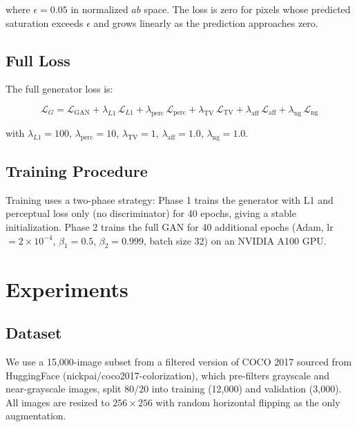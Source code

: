 \documentclass[conference]{IEEEtran}
\begin{document}
where $\epsilon = 0.05$ in normalized $ab$ space. The loss is zero for pixels
whose predicted saturation exceeds $\epsilon$ and grows linearly as the prediction
approaches zero.

\subsection{Full Loss}

The full generator loss is:

\begin{equation}
    \mathcal{L}_G = \mathcal{L}_{\text{GAN}}
    + \lambda_{L1}\,\mathcal{L}_{L1}
    + \lambda_{\text{perc}}\,\mathcal{L}_{\text{perc}}
    + \lambda_{\text{TV}}\,\mathcal{L}_{\text{TV}}
    + \lambda_{\text{aff}}\,\mathcal{L}_{\text{aff}}
    + \lambda_{\text{ng}}\,\mathcal{L}_{\text{ng}}
\end{equation}

with $\lambda_{L1} = 100$, $\lambda_{\text{perc}} = 10$,
$\lambda_{\text{TV}} = 1$, $\lambda_{\text{aff}} = 1.0$,
$\lambda_{\text{ng}} = 1.0$.

\subsection{Training Procedure}

Training uses a two-phase strategy: Phase 1 trains the generator with L1 and
perceptual loss only (no discriminator) for 40 epochs, giving a stable
initialization. Phase 2 trains the full GAN for 40 additional epochs (Adam,
lr $= 2 \times 10^{-4}$, $\beta_1 = 0.5$, $\beta_2 = 0.999$, batch size 32)
on an NVIDIA A100 GPU.


\section{Experiments}

\subsection{Dataset}

We use a 15,000-image subset from a filtered version of COCO 2017
\cite{lin2014microsoft} sourced from HuggingFace (nickpai/coco2017-colorization),
which pre-filters grayscale and near-grayscale images, split 80/20 into
training (12,000) and validation (3,000). All images are resized to
$256 \times 256$ with random horizontal flipping as the only augmentation.
\end{document}
